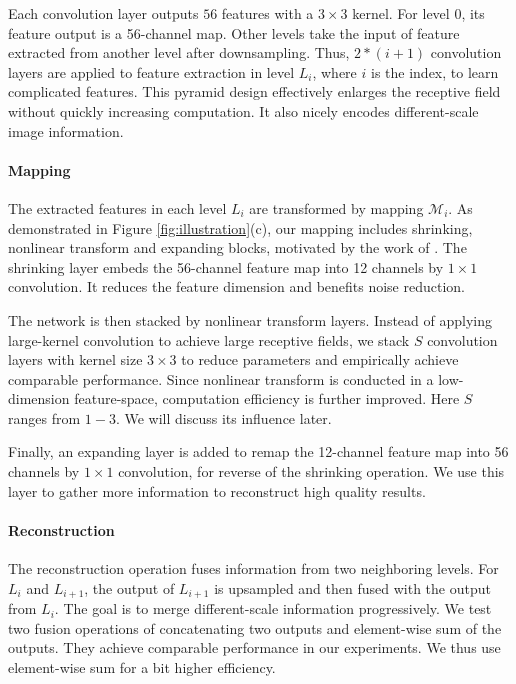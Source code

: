 \documentclass[10pt,twocolumn,letterpaper]{article}
\begin{document}
Each convolution layer outputs $56$ features with a $3\times3$ kernel. For level 0, its
feature output is a 56-channel map. Other levels take the input of feature extracted from
another level after downsampling. Thus, $2*(i+1)$ convolution layers are applied to
feature extraction in level $L_i$, where $i$ is the index, to learn complicated features.
This pyramid design effectively enlarges the receptive field without quickly increasing
computation. It also nicely encodes different-scale image information.

\vspace{-0.15in}\paragraph{Mapping} The extracted features in each level $L_i$ are
transformed by mapping $\mathcal{M}_i$. As demonstrated in Figure
\ref{fig:illustration}(c), our mapping includes shrinking, nonlinear transform and
expanding blocks, motivated by the work of \cite{DongLT16}. The shrinking layer embeds
the 56-channel feature map into 12 channels by $1\times 1$ convolution. It reduces the
feature dimension and benefits noise reduction.

The network is then stacked by nonlinear transform layers. Instead of applying
large-kernel convolution \cite{XuRLJ14,DongLHT16_SRCNN,LiHA016} to achieve large
receptive fields, we stack $S$ convolution layers with kernel size $3\times3$ to reduce
parameters and empirically achieve comparable performance. Since nonlinear transform is
conducted in a low-dimension feature-space, computation efficiency is further improved.
Here $S$ ranges from $1-3$. We will discuss its influence later.

Finally, an expanding layer is added to remap the 12-channel feature map into 56 channels
by $1\times 1$ convolution, for reverse of the shrinking operation. We use this layer to
gather more information to reconstruct high quality results.

\vspace{-0.15in}\paragraph{Reconstruction} The reconstruction operation fuses information
from two neighboring levels. For $L_i$ and $L_{i+1}$, the output of $L_{i+1}$ is
upsampled and then fused with the output from $L_{i}$. The goal is to merge
different-scale information progressively. We test two fusion operations of concatenating
two outputs and element-wise sum of the outputs. They achieve comparable performance in
our experiments. We thus use element-wise sum for a bit higher efficiency.
\end{document}
